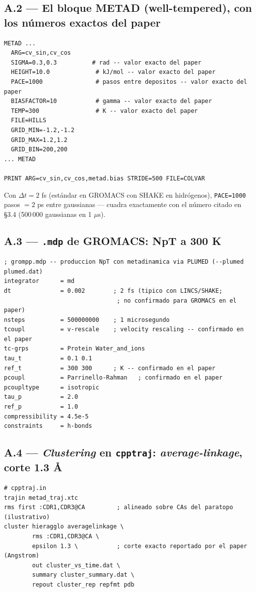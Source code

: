 \documentclass[11pt]{article}
\begin{document}
\subsection*{A.2 --- El bloque METAD (well-tempered), con los números exactos del paper}
{\footnotesize\begin{verbatim}
METAD ...
  ARG=cv_sin,cv_cos
  SIGMA=0.3,0.3          # rad -- valor exacto del paper
  HEIGHT=10.0             # kJ/mol -- valor exacto del paper
  PACE=1000               # pasos entre depositos -- valor exacto del paper
  BIASFACTOR=10           # gamma -- valor exacto del paper
  TEMP=300                # K -- valor exacto del paper
  FILE=HILLS
  GRID_MIN=-1.2,-1.2
  GRID_MAX=1.2,1.2
  GRID_BIN=200,200
... METAD

PRINT ARG=cv_sin,cv_cos,metad.bias STRIDE=500 FILE=COLVAR
\end{verbatim}}
Con $\Delta t = 2$ fs (estándar en GROMACS con SHAKE en hidrógenos), \texttt{PACE=1000} pasos $=2$ ps entre gaussianas --- cuadra exactamente con el número citado en \S3.4 (500\,000 gaussianas en 1 $\mu$s).

\subsection*{A.3 --- \texttt{.mdp} de GROMACS: NpT a 300 K}
{\footnotesize\begin{verbatim}
; grompp.mdp -- produccion NpT con metadinamica via PLUMED (--plumed plumed.dat)
integrator      = md
dt              = 0.002        ; 2 fs (tipico con LINCS/SHAKE;
                                ; no confirmado para GROMACS en el paper)
nsteps          = 500000000    ; 1 microsegundo
tcoupl          = v-rescale    ; velocity rescaling -- confirmado en el paper
tc-grps         = Protein Water_and_ions
tau_t           = 0.1 0.1
ref_t           = 300 300      ; K -- confirmado en el paper
pcoupl          = Parrinello-Rahman   ; confirmado en el paper
pcoupltype      = isotropic
tau_p           = 2.0
ref_p           = 1.0
compressibility = 4.5e-5
constraints     = h-bonds
\end{verbatim}}

\subsection*{A.4 --- \textit{Clustering} en \texttt{cpptraj}: \textit{average-linkage}, corte 1.3 \r{A}}
{\footnotesize\begin{verbatim}
# cpptraj.in
trajin metad_traj.xtc
rms first :CDR1,CDR3@CA         ; alineado sobre CAs del paratopo (ilustrativo)
cluster hieragglo averagelinkage \
        rms :CDR1,CDR3@CA \
        epsilon 1.3 \           ; corte exacto reportado por el paper (Angstrom)
        out cluster_vs_time.dat \
        summary cluster_summary.dat \
        repout cluster_rep repfmt pdb
\end{verbatim}}
\end{document}

